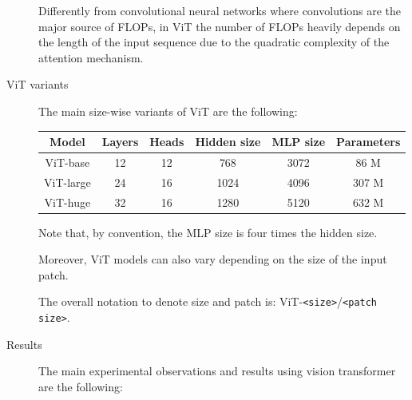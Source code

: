 \begin{description}
        \begin{remark}
            Differently from convolutional neural networks where convolutions are the major source of FLOPs, in ViT the number of FLOPs heavily depends on the length of the input sequence due to the quadratic complexity of the attention mechanism.
        \end{remark}

    \item[ViT variants]
        The main size-wise variants of ViT are the following:
        \begin{center}
            \small
            \begin{tabular}{cccccc}
                \toprule
                \textbf{Model} & \textbf{Layers} & \textbf{Heads} & \textbf{Hidden size} & \textbf{MLP size} & \textbf{Parameters} \\
                \midrule
                ViT-base    & 12 & 12 & 768 & 3072 & 86 M \\
                ViT-large   & 24 & 16 & 1024 & 4096 & 307 M \\
                ViT-huge    & 32 & 16 & 1280 & 5120 & 632 M \\
                \bottomrule
            \end{tabular}
        \end{center}
        Note that, by convention, the MLP size is four times the hidden size.

        Moreover, ViT models can also vary depending on the size of the input patch.

        The overall notation to denote size and patch is: ViT-\texttt{<size>}/\texttt{<patch size>}.

    \item[Results]
        The main experimental observations and results using vision transformer are the following:
\end{description}
